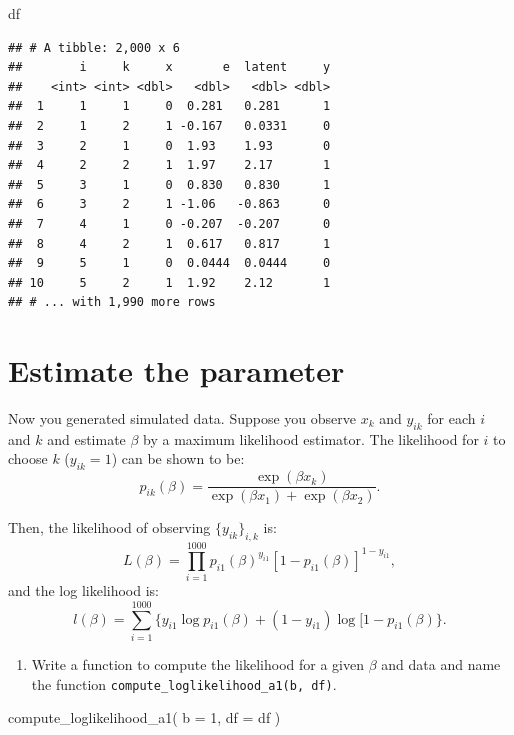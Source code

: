 \documentclass[
]{book}
\newenvironment{Shaded}{\begin{snugshade}}{\end{snugshade}}
\newcommand{\AttributeTok}[1]{\textcolor[rgb]{0.77,0.63,0.00}{#1}}
\newcommand{\DecValTok}[1]{\textcolor[rgb]{0.00,0.00,0.81}{#1}}
\newcommand{\FunctionTok}[1]{\textcolor[rgb]{0.00,0.00,0.00}{#1}}
\newcommand{\NormalTok}[1]{#1}
\providecommand{\tightlist}{%
  \setlength{\itemsep}{0pt}\setlength{\parskip}{0pt}}
\begin{document}
\begin{Shaded}
\begin{Highlighting}[]
\NormalTok{df}
\end{Highlighting}
\end{Shaded}

\begin{verbatim}
## # A tibble: 2,000 x 6
##        i     k     x       e  latent     y
##    <int> <int> <dbl>   <dbl>   <dbl> <dbl>
##  1     1     1     0  0.281   0.281      1
##  2     1     2     1 -0.167   0.0331     0
##  3     2     1     0  1.93    1.93       0
##  4     2     2     1  1.97    2.17       1
##  5     3     1     0  0.830   0.830      1
##  6     3     2     1 -1.06   -0.863      0
##  7     4     1     0 -0.207  -0.207      0
##  8     4     2     1  0.617   0.817      1
##  9     5     1     0  0.0444  0.0444     0
## 10     5     2     1  1.92    2.12       1
## # ... with 1,990 more rows
\end{verbatim}

\hypertarget{estimate-the-parameter}{%
\section{Estimate the parameter}\label{estimate-the-parameter}}

Now you generated simulated data. Suppose you observe \(x_k\) and \(y_{ik}\) for each \(i\) and \(k\) and estimate \(\beta\) by a maximum likelihood estimator. The likelihood for \(i\) to choose \(k\) (\(y_{ik} = 1\)) can be shown to be:
\[
p_{ik}(\beta) = \frac{\exp(\beta x_k)}{\exp(\beta x_1) + \exp(\beta x_2)}.
\]

Then, the likelihood of observing \(\{y_{ik}\}_{i, k}\) is:
\[
L(\beta) = \prod_{i = 1}^{1000} p_{i1}(\beta)^{y_{i1}} [1 - p_{i1}(\beta)]^{1 - y_{i1}},
\]
and the log likelihood is:
\[
l(\beta) = \sum_{i = 1}^{1000}\{y_{i1}\log p_{i1}(\beta) + (1 - y_{i1})\log [1 - p_{i1}(\beta)\}.
\]

\begin{enumerate}
\def\labelenumi{\arabic{enumi}.}
\tightlist
\item
  Write a function to compute the likelihood for a given \(\beta\) and data and name the function \texttt{compute\_loglikelihood\_a1(b,\ df)}.
\end{enumerate}

\begin{Shaded}
\begin{Highlighting}[]
\FunctionTok{compute\_loglikelihood\_a1}\NormalTok{(}
    \AttributeTok{b =} \DecValTok{1}\NormalTok{,}
    \AttributeTok{df =}\NormalTok{ df}
\NormalTok{    ) }
\end{Highlighting}
\end{Shaded}
\end{document}
